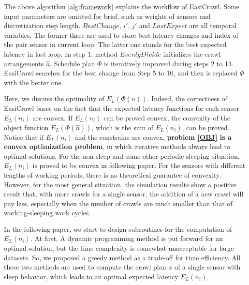 \documentclass[conference]{IEEEtran}
\begin{document}
The above algorithm \ref{alg:framework} explains the workflow of EasiCrawl. 
Some input parameters are omitted for brief, such as weights of sensors and discretization step length.
$BestChange$, $i'$, $j'$ and $LastExpect$ are all temporal variables.
The former three are used to store best latency changes and index of the pair sensor in current loop.
The latter one stands for the best expected latency in last loop.
In step 1, method $EvenlyDivide$ initializes the crawl arrangements $\hat{n}$. 
Schedule plan $\Phi$ is iteratively improved during steps 2 to 13. 
EasiCrawl searches for the best change from Step 5 to 10, and then is replaced $\Phi$ with the better one.

Here, we discuss the optimality of $E_L(\Phi(\hat{n}))$.
Indeed, the correctness of EasiCrawl bases on the fact that the expected latency functions for each sensor $E_L(n_i)$ are convex. 
If $E_L(n_i)$ can be proved convex, the convexity of the object function $E_L(\Phi(\hat{n}))$, which is the sum of $E_L(n_i)$, can be proved.
Notice that if $E_L(n_i)$ and the constrains are convex, \textbf{problem \eqref{OBJ} is a convex optimization problem}, in which iterative methods always lead to optimal solutions.
For the non-sleep and some other periodic sleeping situation, $E_L(n_i)$ is proved to be convex in following paper.
For the sensors with different lengths of working periods, there is no theoretical guarantee of convexity.
However, for the most general situation, the simulation results show a positive result that, with more crawls for a single sensor, the addition of a new crawl will pay less, especially when the number of crawls are much smaller than that of working-sleeping work cycles.

In the following paper, we start to design subroutines for the computation of $E_L(n_i)$.
At first, A dynamic programming method is put forward for an optimal solution,  but the time complexity is somewhat unacceptable for large datasets.
So, we proposed a greedy method as a trade-off for time efficiency. 
All these two methods are used to compute the crawl plan $\phi$ of a single sensor with sleep behavior, which leads to an optimal expected latency $E_L(n_i)$.
\end{document}
